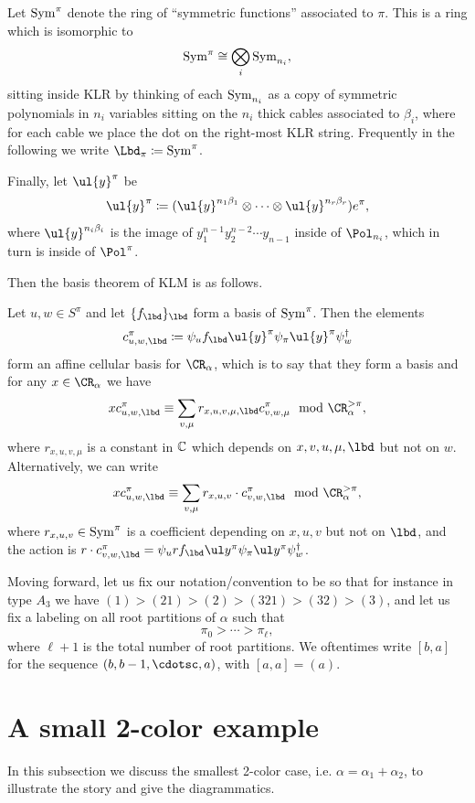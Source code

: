 \documentclass[11pt,reqno]{amsart}
\begin{document}
Let $\operatorname{Sym}^\pi$ denote the ring of ``symmetric functions'' associated to $\pi$. This is a ring which is isomorphic to
\[\operatorname{Sym}^\pi\cong \bigotimes_i\operatorname{Sym}_{n_i},\] 
sitting inside KLR by thinking of each $\operatorname{Sym}_{n_i}$ as a copy of symmetric polynomials in $n_i$ variables sitting on the $n_i$ thick cables associated to $\beta_i$, where for each cable we place the dot on the right-most KLR string. Frequently in the following we write $\Lbd_\pi\coloneqq \Sym^\pi$. 

Finally, let $\ul{y}^\pi$ be
\[\ul{y}^\pi\coloneqq (\ul{y}^{n_1\beta_1}\otimes\cdots\otimes \ul{y}^{n_r\beta_r})e^\pi,\] 
where $\ul{y}^{n_i\beta_i}$ is the image of $y_1^{n-1}y_2^{n-2}\cdots y_{n-1}$ inside of $\Pol_{n_i}$, which in turn is inside of $\Pol^\pi$. 

Then the basis theorem of KLM is as follows.
\begin{theorem}[KLM]
    Let $u,w\in S^\pi$ and let $\{f_\lbd\}_\lbd$ form a basis of $\operatorname{Sym}^\pi$. Then the elements
    \[c_{u,w,\lbd}^\pi\coloneqq \psi_u f_\lbd \ul{y}^\pi \psi_\pi \ul{y}^\pi \psi_w^\dag\] 
    form an affine cellular basis for $\CR_\alpha$, which is to say that they form a basis and for any $x\in\CR_\alpha$ we have
    \[x c_{u,w,\lbd}^\pi \equiv \sum_{v,\mu} r_{x,u,v,\mu,\lbd} c_{v,w,\mu}^\pi \mod \CR_\alpha^{>\pi},\] 
    where $r_{x,u,v,\mu}$ is a constant in $\mathbb C$ which depends on $x,v,u,\mu,\lbd$ but not on $w$. Alternatively, we can write \[x c_{u,w,\lbd}^\pi \equiv \sum_{v,\mu} r_{x,u,v} \cdot c_{v,w,\lbd}^\pi \mod \CR_\alpha^{>\pi},\]   where $r_{x,u,v}\in\operatorname{Sym}^\pi$ is a coefficient depending on $x,u,v$ but not on $\lbd$, and the action is $r\cdot c_{v,w,\lbd}^\pi=\psi_u rf_\lbd \ul y^\pi \psi_\pi \ul y^\pi \psi_w^\dag$. 
\end{theorem}

Moving forward, let us fix our notation/convention to be so that for instance in type $A_3$ we have $(1)>(21)>(2)>(321)>(32)>(3)$, and let us fix a labeling on all root partitions of $\alpha$ such that
\[\pi_0>\cdots>\pi_\ell,\] 
where $\ell+1$ is the total number of root partitions. We oftentimes write $[b,a]$ for the sequence $(b,b-1,\cdotsc,a)$, with $[a,a]=(a)$.


\section{A small 2-color example}\label{sect:2color}
In this subsection we discuss the smallest 2-color case, i.e. $\alpha=\alpha_1+\alpha_2$, to illustrate the story and give the diagrammatics.
\end{document}
